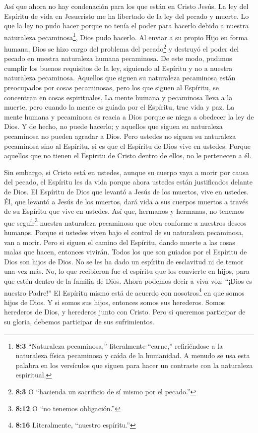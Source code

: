  Así que ahora no hay condenación para los que están en
Cristo Jesús.  La ley del Espíritu de vida en Jesucristo me
ha libertado de la ley del pecado y muerte.  Lo que la ley
no pudo hacer porque no tenía el poder para hacerlo debido a nuestra
naturaleza pecaminosa\footnote{\textbf{8:3} ``Naturaleza pecaminosa,''
  literalmente ``carne,'' refiriéndose a la naturaleza física pecaminosa
  y caída de la humanidad. A menudo se usa esta palabra en los
  versículos que siguen para hacer un contraste con la naturaleza
  espiritual.}, Dios pudo hacerlo. Al enviar a su propio Hijo en forma
humana, Dios se hizo cargo del problema del pecado\footnote{\textbf{8:3}
  O ``hacienda un sacrificio de sí mismo por el pecado.''} y destruyó el
poder del pecado en nuestra naturaleza humana pecaminosa. 
De este modo, pudimos cumplir los buenos requisitos de la ley, siguiendo
al Espíritu y no a nuestra naturaleza pecaminosa.  Aquellos
que siguen su naturaleza pecaminosa están preocupados por cosas
pecaminosas, pero los que siguen al Espíritu, se concentran en cosas
espirituales.  La mente humana y pecaminosa lleva a la
muerte, pero cuando la mente es guiada por el Espíritu, trae vida y paz.
 La mente humana y pecaminosa es reacia a Dios porque se
niega a obedecer la ley de Dios. Y de hecho, no puede hacerlo;
 y aquellos que siguen su naturaleza pecaminosa no pueden
agradar a Dios.  Pero ustedes no siguen su naturaleza
pecaminosa sino al Espíritu, si es que el Espíritu de Dios vive en
ustedes. Porque aquellos que no tienen el Espíritu de Cristo dentro de
ellos, no le pertenecen a él.

 Sin embargo, si Cristo está en ustedes, aunque su cuerpo
vaya a morir por causa del pecado, el Espíritu les da vida porque ahora
ustedes están justificados delante de Dios.  El Espíritu de
Dios que levantó a Jesús de los muertos, vive en ustedes. Él, que
levantó a Jesús de los muertos, dará vida a sus cuerpos muertos a través
de su Espíritu que vive en ustedes.  Así que, hermanos y
hermanas, no tenemos que seguir\footnote{\textbf{8:12} O ``no tenemos
  obligación.''} nuestra naturaleza pecaminosa que obra conforme a
nuestros deseos humanos.  Porque si ustedes viven bajo el
control de su naturaleza pecaminosa, van a morir. Pero si siguen el
camino del Espíritu, dando muerte a las cosas malas que hacen, entonces
vivirán.  Todos los que son guiados por el Espíritu de Dios
son hijos de Dios.  No se les ha dado un espíritu de
esclavitud ni de temor una vez más. No, lo que recibieron fue el
espíritu que los convierte en hijos, para que estén dentro de la familia
de Dios. Ahora podemos decir a viva voz: ``¡Dios es nuestro Padre!''
 El Espíritu mismo está de acuerdo con nosotros\footnote{\textbf{8:16}
  Literalmente, ``nuestro espíritu.''} en que somos hijos de Dios.
 Y si somos sus hijos, entonces somos sus herederos. Somos
herederos de Dios, y herederos junto con Cristo. Pero si queremos
participar de su gloria, debemos participar de sus sufrimientos.

